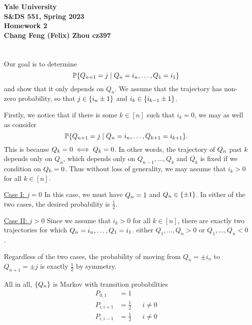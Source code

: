 \documentclass[10pt]{article}
\DeclarePairedDelimiter{\set}{\lbrace}{\rbrace}
\let\abs\relax
\DeclarePairedDelimiter{\abs}{\lvert}{\rvert}
\renewcommand{\P}{\mathbb{P}}
\begin{document}
\begin{center}
    {\Large\textbf{Yale University}}\\
    \vspace{3mm}
    {\Large\textbf{S\&DS 551, Spring 2023}}\\
    \vspace{2mm}
    {\Large\textbf{Homework 2}}\\
    \vspace{3mm}
    \textbf{Chang Feng (Felix) Zhou cz397}
\end{center}

\section{}
\subsection{}
Our goal is to determine
\[
  \P\set{\abs{Q_{n+1}} = j\mid \abs{Q_n}=i_n, \dots, \abs{Q_1}=i_1}
\]
and show that it only depends on $Q_n$.
We assume that the trajectory has non-zero probability,
so that $j\in \set{i_n\pm 1}$ and $i_k\in \set{i_{k-1}\pm 1}$.

Firstly,
we notice that if there is some $k\in [n]$ such that $i_k = 0$,
we may as well as consider
\[
  \P\set{\abs{Q_{n+1}} = j\mid \abs{Q_n}=i_n, \dots, \abs{Q_{k+1}}=i_{k+1}}.
\]
This is because $\abs{Q_k} = 0 \iff Q_k = 0$.
In other words,
the trajectory of $\abs{Q_n}$ past $k$ depends only on $Q_n$,
which depends only on $Q_{n-1}, \dots, Q_k$
and $Q_k$ is fixed if we condition on $\abs{Q_k} = 0$.
Thus without loss of generality,
we may assume that $i_k > 0$ for all $k\in [n]$.

\underline{Case I: $j = 0$}
In this case,
we must have $\abs{Q_n} = 1$
and $Q_n\in \set{\pm 1}$.
In either of the two cases,
the desired probability is $\frac12$.

\underline{Case II: $j > 0$}
Since we assume that $i_k > 0$ for all $k \in [n]$,
there are exactly two trajectories for which $\abs{Q_n} = i_n, \dots, \abs{Q_1} = i_1$.
either $Q_1, \dots, Q_n > 0$ or $Q_1, \dots, Q_n < 0$.

Regardless of the two cases,
the probability of moving from $Q_n = \pm i_n$ to $Q_{n+1} = \pm j$
is exactly $\frac12$ by symmetry.

All in all,
$\set{\abs{Q_n}}$ is Markov with transition probabilities
\begin{align*}
  P_{0,1} &= 1 \\
  P_{i,i+1} &= \frac12 &&i\neq 0 \\
  P_{i, i-1} &= \frac12 &&i\neq 0
\end{align*}
\end{document}
